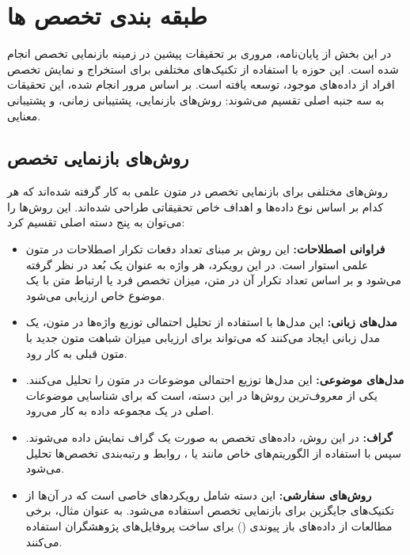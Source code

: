 \section*{طبقه بندی تخصص ها}

در این بخش از پایان‌نامه، مروری بر تحقیقات پیشین در زمینه بازنمایی تخصص انجام شده است. این حوزه با استفاده از تکنیک‌های مختلفی برای استخراج و نمایش تخصص افراد از داده‌های موجود، توسعه یافته است. بر اساس مرور انجام شده، این تحقیقات به سه جنبه اصلی تقسیم می‌شوند: روش‌های بازنمایی، پشتیبانی زمانی، و پشتیبانی معنایی.

\subsection*{روش‌های بازنمایی تخصص} روش‌های مختلفی برای بازنمایی تخصص در متون علمی به کار گرفته شده‌اند که هر کدام بر اساس نوع داده‌ها و اهداف خاص تحقیقاتی طراحی شده‌اند. این روش‌ها را می‌توان به پنج دسته اصلی تقسیم کرد: \begin{itemize} \item \textbf{فراوانی اصطلاحات:} این روش بر مبنای تعداد دفعات تکرار اصطلاحات در متون علمی استوار است. در این رویکرد، هر واژه به عنوان یک بُعد در نظر گرفته می‌شود و بر اساس تعداد تکرار آن در متن، میزان تخصص فرد یا ارتباط متن با یک موضوع خاص ارزیابی می‌شود. \item \textbf{مدل‌های زبانی:} این مدل‌ها با استفاده از تحلیل احتمالی توزیع واژه‌ها در متون، یک مدل زبانی ایجاد می‌کنند که می‌تواند برای ارزیابی میزان شباهت متون جدید با متون قبلی به کار رود. \item \textbf{مدل‌های موضوعی:} این مدل‌ها توزیع احتمالی موضوعات در متون را تحلیل می‌کنند. یکی از معروف‌ترین روش‌ها در این دسته،  است که برای شناسایی موضوعات اصلی در یک مجموعه داده به کار می‌رود. \item \textbf{گراف:} در این روش، داده‌های تخصص به صورت یک گراف نمایش داده می‌شوند. سپس با استفاده از الگوریتم‌های خاص مانند  یا ، روابط و رتبه‌بندی تخصص‌ها تحلیل می‌شود. \item \textbf{روش‌های سفارشی:} این دسته شامل رویکردهای خاصی است که در آن‌ها از تکنیک‌های جایگزین برای بازنمایی تخصص استفاده می‌شود. به عنوان مثال، برخی مطالعات از داده‌های باز پیوندی () برای ساخت پروفایل‌های پژوهشگران استفاده می‌کنند. \end{itemize}

